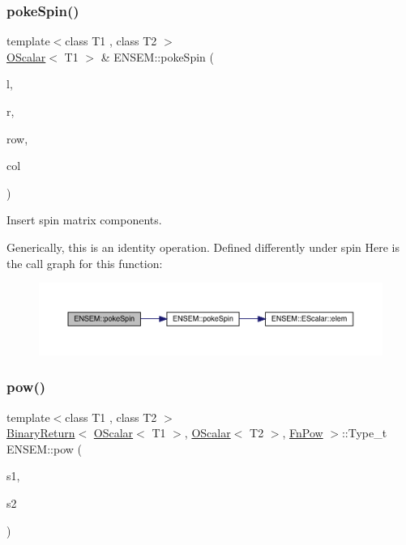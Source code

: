 \subsubsection{\texorpdfstring{pokeSpin()}{pokeSpin()}\hspace{0.1cm}{\footnotesize\ttfamily [2/2]}}
{\footnotesize\ttfamily template$<$class T1 , class T2 $>$ \\
\mbox{\hyperlink{classENSEM_1_1OScalar}{O\+Scalar}}$<$ T1 $>$ \& E\+N\+S\+E\+M\+::poke\+Spin (\begin{DoxyParamCaption}\item[{\mbox{\hyperlink{classENSEM_1_1OScalar}{O\+Scalar}}$<$ T1 $>$ \&}]{l,  }\item[{const \mbox{\hyperlink{classENSEM_1_1OScalar}{O\+Scalar}}$<$ T2 $>$ \&}]{r,  }\item[{int}]{row,  }\item[{int}]{col }\end{DoxyParamCaption})\hspace{0.3cm}{\ttfamily [inline]}}



Insert spin matrix components. 

Generically, this is an identity operation. Defined differently under spin Here is the call graph for this function\+:\nopagebreak
\begin{figure}[H]
\begin{center}
\leavevmode
\includegraphics[width=350pt]{d1/d71/group__obsscalar_gadabf69e63453311d92faee77643c2b7a_cgraph}
\end{center}
\end{figure}
\mbox{\label{group__obsscalar_ga9cb05cc2982ed462255669689f38c8cd}} 
\subsubsection{\texorpdfstring{pow()}{pow()}}
{\footnotesize\ttfamily template$<$class T1 , class T2 $>$ \\
\mbox{\hyperlink{structENSEM_1_1BinaryReturn}{Binary\+Return}}$<$ \mbox{\hyperlink{classENSEM_1_1OScalar}{O\+Scalar}}$<$ T1 $>$, \mbox{\hyperlink{classENSEM_1_1OScalar}{O\+Scalar}}$<$ T2 $>$, \mbox{\hyperlink{structENSEM_1_1FnPow}{Fn\+Pow}} $>$\+::Type\+\_\+t E\+N\+S\+E\+M\+::pow (\begin{DoxyParamCaption}\item[{const \mbox{\hyperlink{classENSEM_1_1OScalar}{O\+Scalar}}$<$ T1 $>$ \&}]{s1,  }\item[{const \mbox{\hyperlink{classENSEM_1_1OScalar}{O\+Scalar}}$<$ T2 $>$ \&}]{s2 }\end{DoxyParamCaption})\hspace{0.3cm}{\ttfamily [inline]}}




